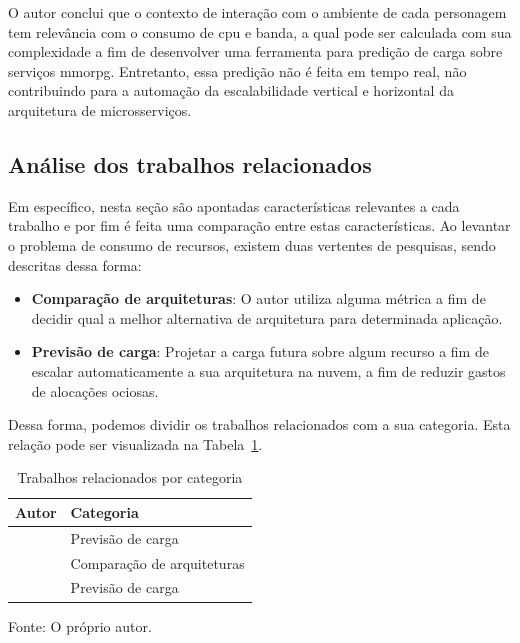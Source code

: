 O autor conclui que o contexto de interação com o ambiente de cada personagem tem relevância com o consumo de \ac{cpu} e banda, a qual pode ser calculada com sua complexidade a fim de desenvolver uma ferramenta para predição de carga sobre serviços \ac{mmorpg}.
%
Entretanto, essa predição não é feita em tempo real, não contribuindo para a automação da escalabilidade vertical e horizontal da arquitetura de microsserviços.



\subsection{Análise dos trabalhos relacionados}
\label{sec:similares_analise}



Em específico, nesta seção são apontadas características relevantes a cada trabalho e por fim é feita uma comparação entre estas características. %
%
Ao levantar o problema de consumo de recursos, existem duas vertentes de pesquisas, sendo descritas dessa forma:

\begin{itemize}
  \item \textbf{Comparação de arquiteturas}: O autor utiliza alguma métrica a fim de decidir qual a melhor alternativa de arquitetura para determinada aplicação.
  \item \textbf{Previsão de carga}: Projetar a carga futura sobre algum recurso a fim de escalar automaticamente a sua arquitetura na nuvem, a fim de reduzir gastos de alocações ociosas.
\end{itemize}

Dessa forma, podemos dividir os trabalhos relacionados com a sua categoria. %
%
Esta relação pode ser visualizada na Tabela~\ref{tab:categoria_trabalhos}.

\begin{table}[htb!]
\centering
\caption{Trabalhos relacionados por categoria}
\label{tab:categoria_trabalhos}
\begin{tabular}{|l|l|}
\hline
Autor & Categoria                            \\ \hline
\cite{6374456}  & Previsão de carga          \\ \hline
\cite{7515686}  & Comparação de arquiteturas \\ \hline
\cite{1417630}  & Previsão de carga          \\ \hline
\end{tabular}


Fonte: O próprio autor.
\end{table}


